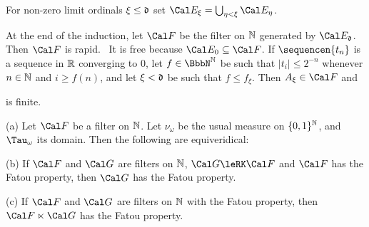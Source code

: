 {\noindent For non-zero limit ordinals $\xi\le\frak d$ set
$\Cal E_{\xi}=\bigcup_{\eta<\xi}\Cal E_{\eta}$.

At the end of the induction, let $\Cal F$ be the filter on $\Bbb N$
generated by $\Cal E_{\frak d}$.   Then $\Cal F$ is rapid.   \Prf\ It is
free because $\Cal E_0\subseteq\Cal F$.   If $\sequencen{t_n}$ is a
sequence in $\Bbb R$ converging to $0$, let $f\in\NN$ be such that
$|t_i|\le 2^{-n}$ whenever $n\in\Bbb N$ and $i\ge f(n)$, and let
$\xi<\frak d$ be such that $f\le f_{\xi}$.   Then $A_{\xi}\in\Cal F$ and


\noindent is finite.\ \Qed
}%

 (a)
Let $\Cal F$ be a filter on $\Bbb N$.   Let $\nu_{\omega}$ be the usual
measure on $\{0,1\}^{\Bbb N}$, and $\Tau_{\omega}$ its domain.   Then the
following are equiveridical:


(b) If $\Cal F$ and $\Cal G$ are filters on $\Bbb N$, $\Cal G\leRK\Cal F$
and $\Cal F$ has the Fatou property, then $\Cal G$ has the Fatou property.

(c) If $\Cal F$ and $\Cal G$ are filters on $\Bbb N$ with
the Fatou property, then $\Cal F\ltimes\Cal G$ has the Fatou property.

\medskip

